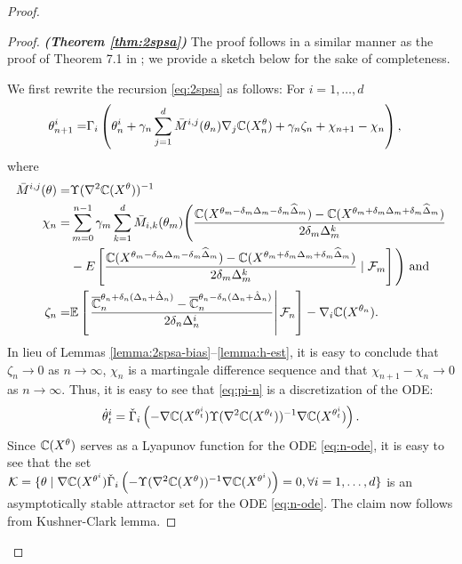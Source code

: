 \documentclass{article}
\numberwithin{equation}{section}
\numberwithin{theorem}{section}
\begin{document}
\begin{proof}
\begin{proof}\textbf{\textit{(Theorem \ref{thm:2spsa})}}
The proof follows in a similar manner as the proof of Theorem 7.1 in \cite{Bhatnagar13SR}; we provide a sketch below for the sake of completeness.

We first rewrite the recursion \eqref{eq:2spsa} as follows:
For $i=1,\ldots, d$
\begin{align}
 \theta^{i}_{n+1} =& \Gamma_{i}\left(\theta^{i}_n + \gamma_n \sum_{j=1}^{d} \bar M^{i,j}(\theta_n) \nabla_{j} \mathbb{C}(X^\theta_n) + \gamma_n \zeta_n + \chi_{n+1} - \chi_n \right), \label{eq:pi-n}
\end{align}
where 
\begin{align*}
\bar M^{i,j}(\theta) = &\Upsilon(\nabla^2 \mathbb{C}(X^{\theta}))^{-1}\\
 \chi_n =& \sum_{m=0}^{n-1} \gamma_m \sum_{k=1}^{d} {\bar{M}}_{i,k}(\theta_m)\Bigg(
\frac{\mathbb{C}(X^{\theta_m-\delta_m\Delta_m - \delta_m\widehat\Delta_m}) -
\mathbb{C}(X^{\theta_m+\delta_m\Delta_m + \delta_m\widehat\Delta_m})}{2\delta_m \Delta^k_m} 
 \\
 &- E\left[\frac{\mathbb{C}(X^{\theta_m-\delta_m\Delta_m - \delta_m\widehat\Delta_m}) -
\mathbb{C}(X^{\theta_m+\delta_m\Delta_m + \delta_m\widehat\Delta_m})}{2\delta_m \Delta^k_m} 
\mid {\cal F}_m\right]\Bigg) \text{ and}\\
\zeta_n = &\mathbb{E}\left[\left.\dfrac{\overline {\mathbb{C}}_n^{\theta_n + \delta_n (\Delta_n + \hat \Delta_n)} -\overline {\mathbb{C}}_n^{\theta_n - \delta_n (\Delta_n + \hat \Delta_n)}}{2 \delta_n \Delta_n^i}\right| \mathcal{F}_n \right] - \nabla_i \mathbb{C}(X^{\theta_n}).
\end{align*}
In lieu of Lemmas \ref{lemma:2spsa-bias}--\ref{lemma:h-est}, it is easy to conclude that $\zeta_n \rightarrow 0$ as $n\rightarrow \infty$, $\chi_n$ is a martingale difference sequence and that $\chi_{n+1} - \chi_n \rightarrow 0$ as $n\rightarrow \infty$. 
Thus, it is easy to see that \eqref{eq:pi-n} is a discretization of the ODE:
\begin{align}
\dot\theta^{i}_t = \check\Gamma_{i}\left(- \nabla \mathbb{C}(X^{\theta^{i}_t}) \Upsilon(\nabla^2 \mathbb{C}(X^{\theta_t}))^{-1} \nabla \mathbb{C}(X^{\theta^{i}_t}) \right).
\label{eq:n-ode}
\end{align}
Since $\mathbb{C}(X^{\theta})$ serves as a Lyapunov function for the ODE \eqref{eq:n-ode}, it is easy to see that the set \\$\mathcal{K} = \{\theta \mid
\nabla \mathbb{C}(X^{\theta^{i}})  \check\Gamma_{i}\left(-\Upsilon(\nabla^2 \mathbb{C}(X^{\theta}))^{-1} \nabla \mathbb{C}(X^{\theta^{i}})\right)
=0, \forall i=1,\ldots,d\}$ is an asymptotically stable attractor set for the ODE \eqref{eq:n-ode}. The claim now follows from Kushner-Clark lemma.
\end{proof}
\end{proof}
\end{document}
